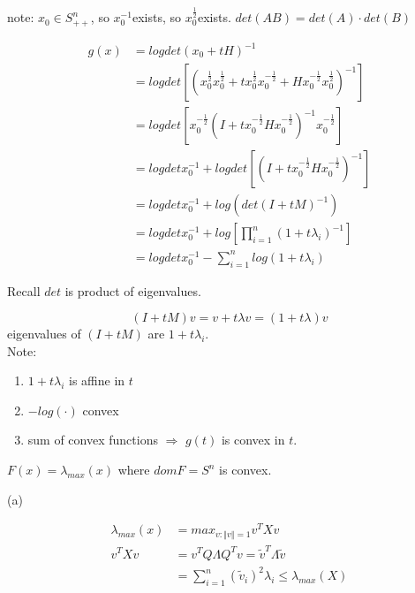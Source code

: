 note: $x_0\in S^n_{++}$, so $x_0^{-1}$exists, so $x_0^{\frac{1}{2}}$exists. $det(AB) = det(A)\cdot det(B)$

\begin{align*}
g(x) &= logdet(x_0+tH)^{-1}\\
&= logdet[(x_0^{\frac{1}{2}}x_0^{\frac{1}{2}}+tx_0^{\frac{1}{2}}x_0^{-\frac{1}{2}}+Hx_0^{-\frac{1}{2}}x_0^{\frac{1}{2}})^{-1}]\\
&= logdet[x_0^{-\frac{1}{2}}(I+tx_0^{-\frac{1}{2}}Hx_0^{-\frac{1}{2}})^{-1}x_0^{-\frac{1}{2}}]\\
&= logdetx_0^{-1} + logdet[(I+tx_0^{-\frac{1}{2}}Hx_0^{-\frac{1}{2}})^{-1}]\\
&= logdetx_0^{-1}+log(det(I+tM)^{-1})\\
&= logdetx_0^{-1}+log[\prod^n_{i=1}(1+t\lambda_i)^{-1}]\\
&= logdetx_0^{-1} - \sum_{i=1}^nlog(1+t\lambda_i)
\end{align*}

Recall $det$ is product of eigenvalues. 

\begin{equation*}
(I+tM)v = v+t\lambda v = (1+t\lambda)v
\end{equation*}
eigenvalues of $(I+tM)$ are $1+t\lambda_i$.\\

Note:

\begin{enumerate}
	\item $1+t\lambda_i$ is affine in $t$
	
	\item $-log(\cdot)$ convex
	
	\item sum of convex functions $\Rightarrow$ $g(t)$ is convex in $t$.
\end{enumerate}







$F(x) = \lambda_{max}(x)$ where $domF = S^n$ is convex. 

(a) 

\begin{align*}
\lambda_{max}(x) &= max_{v:\Vert v\Vert = 1}v^TXv\\
v^TXv &= v^TQ\Lambda Q^Tv = \tilde{v}^T\Lambda \tilde{v}\\
&= \sum^n_{i=1}(\tilde{v}_i)^2\lambda_i \leq \lambda_{max}(X)
\end{align*}

